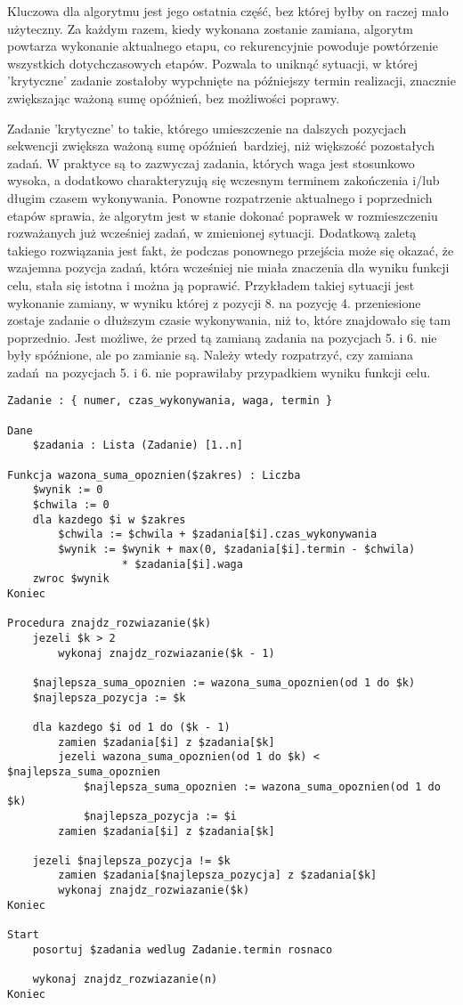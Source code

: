 \documentclass[polish,polish,a4paper]{article}
\begin{document}
Kluczowa dla algorytmu jest jego ostatnia część, bez której byłby on raczej mało użyteczny. Za każdym razem, kiedy wykonana zostanie zamiana, algorytm powtarza wykonanie aktualnego etapu, co rekurencyjnie powoduje powtórzenie wszystkich dotychczasowych etapów. Pozwala to uniknąć sytuacji, w której 'krytyczne' zadanie zostałoby wypchnięte na późniejszy termin realizacji, znacznie zwiększając ważoną sumę opóźnień, bez możliwości poprawy.

Zadanie 'krytyczne' to takie, którego umieszczenie na dalszych pozycjach sekwencji zwiększa ważoną sumę opóźnień bardziej, niż większość pozostałych zadań. W praktyce są to zazwyczaj zadania, których waga jest stosunkowo wysoka, a dodatkowo charakteryzują się wczesnym terminem zakończenia i/lub długim czasem wykonywania. Ponowne rozpatrzenie aktualnego i poprzednich etapów sprawia, że algorytm jest w stanie dokonać poprawek w rozmieszczeniu rozważanych już wcześniej zadań, w zmienionej sytuacji. Dodatkową zaletą takiego rozwiązania jest fakt, że podczas ponownego przejścia może się okazać, że wzajemna pozycja zadań, która wcześniej nie miała znaczenia dla wyniku funkcji celu, stała się istotna i można ją poprawić. Przykładem takiej sytuacji jest wykonanie zamiany, w wyniku której z pozycji 8. na pozycję 4. przeniesione zostaje zadanie o dłuższym czasie wykonywania, niż to, które znajdowało się tam poprzednio. Jest możliwe, że przed tą zamianą zadania na pozycjach 5. i 6. nie były spóźnione, ale po zamianie są. Należy wtedy rozpatrzyć, czy zamiana zadań na pozycjach 5. i 6. nie poprawiłaby przypadkiem wyniku funkcji celu.

\begin{lstlisting}[caption = Algorytm 2 - pseudokod]
Zadanie : { numer, czas_wykonywania, waga, termin }

Dane
	$zadania : Lista (Zadanie) [1..n]

Funkcja wazona_suma_opoznien($zakres) : Liczba
	$wynik := 0
	$chwila := 0
	dla kazdego $i w $zakres
		$chwila := $chwila + $zadania[$i].czas_wykonywania
		$wynik := $wynik + max(0, $zadania[$i].termin - $chwila)
		          * $zadania[$i].waga
	zwroc $wynik
Koniec

Procedura znajdz_rozwiazanie($k)
	jezeli $k > 2
		wykonaj znajdz_rozwiazanie($k - 1)
	
	$najlepsza_suma_opoznien := wazona_suma_opoznien(od 1 do $k)
	$najlepsza_pozycja := $k
	
	dla kazdego $i od 1 do ($k - 1)
		zamien $zadania[$i] z $zadania[$k]
		jezeli wazona_suma_opoznien(od 1 do $k) < $najlepsza_suma_opoznien
			$najlepsza_suma_opoznien := wazona_suma_opoznien(od 1 do $k)
			$najlepsza_pozycja := $i
		zamien $zadania[$i] z $zadania[$k]
	
	jezeli $najlepsza_pozycja != $k
		zamien $zadania[$najlepsza_pozycja] z $zadania[$k]
		wykonaj znajdz_rozwiazanie($k)
Koniec

Start
	posortuj $zadania wedlug Zadanie.termin rosnaco
	
	wykonaj znajdz_rozwiazanie(n)
Koniec
\end{lstlisting}
\end{document}
